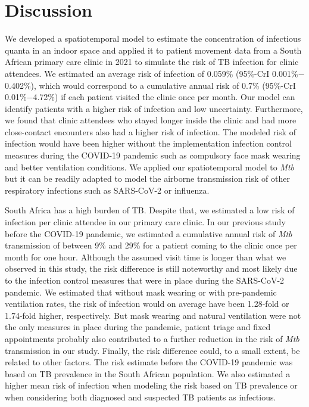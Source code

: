 \documentclass[fleqn,11pt]{wlscirep}
\begin{document}
\FloatBarrier

\newpage

\section{Discussion}

We developed a spatiotemporal model to estimate the concentration of infectious quanta in an indoor space and applied it to patient movement data from a South African primary care clinic in 2021 to simulate the risk of TB infection for clinic attendees. We estimated an average risk of infection of 0.059\% (95\%-CrI 0.001\%$-$0.402\%), which would correspond to a cumulative annual risk of 0.7\% (95\%-CrI 0.01\%$-$4.72\%) if each patient visited the clinic once per month. Our model can identify patients with a higher risk of infection and low uncertainty. Furthermore, we found that clinic attendees who stayed longer inside the clinic and had more close-contact encounters also had a higher risk of infection. The modeled risk of infection would have been higher without the implementation infection control measures during the COVID-19 pandemic such as compulsory face mask wearing and better ventilation conditions. We applied our spatiotemporal model to \emph{Mtb} but it can be readily adapted to model the airborne transmission risk of other respiratory infections such as SARS-CoV-2 or influenza.

South Africa has a high burden of TB\cite{WHO2022TBReport}. Despite that, we estimated a low risk of infection per clinic attendee in our primary care clinic. In our previous study before the COVID-19 pandemic, we estimated a cumulative annual risk of \emph{Mtb} transmission of between 9\% and 29\% for a patient coming to the clinic once per month for one hour. Although the assumed visit time is longer than what we observed in this study, the risk difference is still noteworthy and most likely due to the infection control measures that were in place during the SARS-CoV-2 pandemic. We estimated that without mask wearing or with pre-pandemic ventilation rates, the risk of infection would on average have been 1.28-fold or 1.74-fold higher, respectively. But mask wearing and natural ventilation were not the only measures in place during the pandemic, patient triage and fixed appointments probably also contributed to a further reduction in the risk of \emph{Mtb} transmission in our study. Finally, the risk difference could, to a small extent, be related to other factors. The risk estimate before the COVID-19 pandemic was based on TB prevalence in the South African population. We also estimated a higher mean risk of infection when modeling the risk based on TB prevalence or when considering both diagnosed and suspected TB patients as infectious. 
\end{document}
